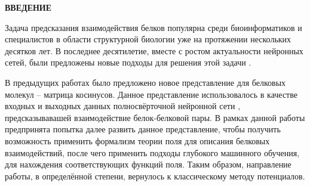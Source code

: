 \newpage
\renewcommand{\contentsname}{\centerline{\large ОГЛАВЛЕНИЕ}}
\tableofcontents

\newpage
{}
\begin{center}
	\textbf{\large ВВЕДЕНИЕ}
\end{center}

Задача предсказания взаимодействия белков популярна среди биоинформатиков и специалистов в области структурной биологии уже на протяжении нескольких десятков лет. В последнее десятилетие, вместе с ростом актуальности нейронных сетей, были предложены новые подходы для решения этой задачи \cite{deep_methods}.

В предыдущих работах \cite{prip2023} было предложено новое представление для белковых молекул -- матрица косинусов. Данное представление использовалось в качестве входных и выходных данных полносвёрточной нейронной сети \cite{fully_conv}, предсказывавашей взаимодействие белок-белковой пары.
В рамках данной работы предпринята попытка далее развить данное представление, чтобы получить возможность применить формализм теории поля для описания белковых взаимодействий, после чего применить подходы глубокого машинного обучения, для нахождения соответствующих функций поля.
Таким образом, направление работы, в определённой степени, вернулось к классическому методу потенциалов.